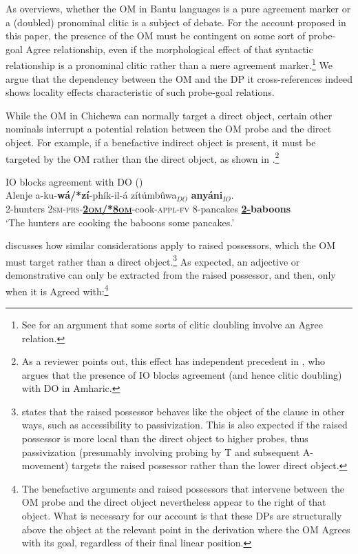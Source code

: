 \documentclass[output=paper,colorlinks,citecolor=brown]{langscibook}
\begin{document}
As \citet{Baker2016} overviews, whether the OM in Bantu languages is a pure agreement marker or a (doubled) pronominal clitic is a subject of debate. For the account proposed in this paper, the presence of the OM must be contingent on some sort of probe-goal Agree relationship, even if the morphological effect of that syntactic relationship is a pronominal clitic rather than a mere agreement marker.\footnote{See \citet{Preminger2015} for an argument that some sorts of clitic doubling involve an Agree relation.} We argue that the dependency between the OM and the DP it cross-references indeed shows locality effects characteristic of such probe-goal relations.

While the OM in Chichewa can normally target a direct object, certain other nominals interrupt a potential relation between the OM probe and the direct object. For example, if a benefactive indirect object is present, it must be targeted by the OM rather than the direct object, as shown in .\footnote{As a reviewer points out, this effect has independent precedent in \citet{Kramer2014}, who argues that the presence of IO blocks agreement (and hence clitic doubling) with DO in Amharic.}

\ea%
    \label{ex:branan:11}
    IO blocks agreement with DO \hfill{(\citealt[101, ex. 41a-b]{Mchombo2004})}\\
    \gll    Alenje a-ku-\textbf{wá/*zí}-phík-il-á zítúmbûwa$_{DO}$  \textbf{anyáni}$_{IO}$. \\
            2-hunters 2\textsc{sm-prs}-\underline{\textbf{\textsc{2om/*8om}}}-cook-\textsc{appl-fv} 8-pancakes \textbf{\underline{2-}baboons}  \\
    \glt    `The hunters are cooking the baboons some pancakes.'
\z

\citet{Mchombo2004} discusses how similar considerations apply to raised possessors, which the OM must target rather than a direct object.\footnote{\citeauthor{Mchombo2004} states that the raised possessor behaves like the object of the clause in other ways, such as accessibility to passivization. This is also expected if the raised possessor is more local than the direct object to higher probes, thus passivization (presumably involving probing by T and subsequent A-movement) targets the raised possessor rather than the lower direct object.} As expected, an adjective or demonstrative can only be extracted from the raised possessor, and then, only when it is Agreed with:\footnote{The benefactive arguments and raised possessors that intervene between the OM probe and the direct object nevertheless appear to the right of that object. What is necessary for our account is that these DPs are structurally above the object at the relevant point in the derivation where the OM Agrees with its goal, regardless of their final linear position.}
\end{document}
